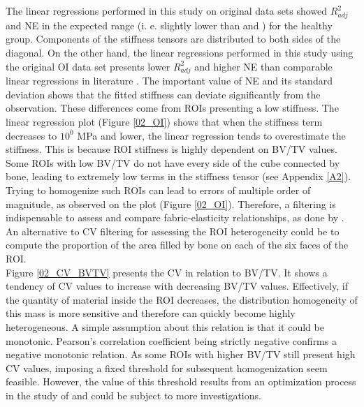 \documentclass[a4paper,fleqn]{DC_ArtStyle}
\begin{document}
The linear regressions performed in this study on original data sets showed $R^2_{adj}$ and NE in the expected range (i. e. slightly lower than \citeauthor{Gross2013}\cite{Gross2013} and \citeauthor{Panyasantisuk2015}\cite{Panyasantisuk2015}) for the healthy group. Components of the stiffness tensors are distributed to both sides of the diagonal. On the other hand, the linear regressions performed in this study using the original OI data set presents lower $R^2_{adj}$ and higher NE than comparable linear regressions in literature \cite{Gross2013,Panyasantisuk2015}. The important value of NE and its standard deviation shows that the fitted stiffness can deviate significantly from the observation. These differences come from ROIs presenting a low stiffness. The linear regression plot (Figure \ref{02_OI}) shows that when the stiffness term decreases to $10^0$ MPa and lower, the linear regression tends to overestimate the stiffness. This is because ROI stiffness is highly dependent on BV/TV values. Some ROIs with low BV/TV do not have every side of the cube connected by bone, leading to extremely low terms in the stiffness tensor (see Appendix \ref{A2}). Trying to homogenize such ROIs can lead to errors of multiple order of magnitude, as observed on the plot (Figure \ref{02_OI}). Therefore, a filtering is indispensable to assess and compare fabric-elasticity relationships, as done by \citeauthor{Panyasantisuk2015} \cite{Panyasantisuk2015}. An alternative to CV filtering for assessing the ROI heterogeneity could be to compute the proportion of the area filled by bone on each of the six faces of the ROI.\\

Figure \ref{02_CV_BVTV} presents the CV in relation to BV/TV. It shows a tendency of CV values to increase with decreasing BV/TV values. Effectively, if the quantity of material inside the ROI decreases, the distribution homogeneity of this mass is more sensitive and therefore can quickly become highly heterogeneous. A simple assumption about this relation is that it could be monotonic. Pearson's correlation coefficient being strictly negative confirms a negative monotonic relation. As some ROIs with higher BV/TV still present high CV values, imposing a fixed threshold for subsequent homogenization seem feasible. However, the value of this threshold results from an optimization process in the study of \citeauthor{Panyasantisuk2015}\cite{Panyasantisuk2015} and could be subject to more investigations.\\
\end{document}

